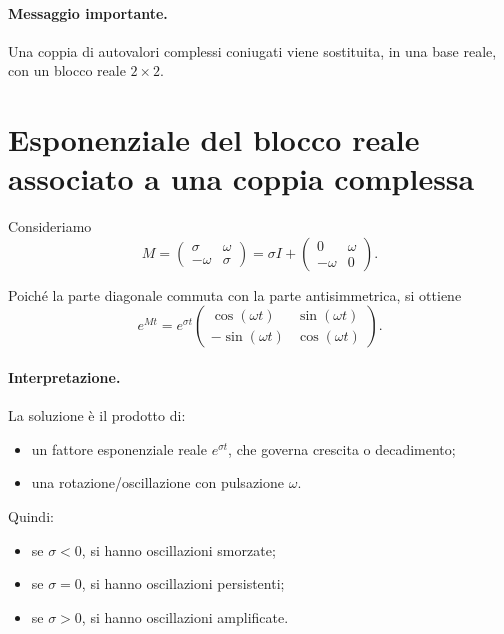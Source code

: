 \paragraph{Messaggio importante.}
Una coppia di autovalori complessi coniugati viene sostituita, in una base reale, con un blocco reale $2\times 2$.

\section{Esponenziale del blocco reale associato a una coppia complessa}

Consideriamo
\[
M=
\begin{pmatrix}
\sigma & \omega\\
-\omega & \sigma
\end{pmatrix}
=
\sigma I+
\begin{pmatrix}
0 & \omega\\
-\omega & 0
\end{pmatrix}.
\]

Poiché la parte diagonale commuta con la parte antisimmetrica, si ottiene
\begin{equation}
e^{Mt}
=
e^{\sigma t}
\begin{pmatrix}
\cos(\omega t) & \sin(\omega t)\\
-\sin(\omega t) & \cos(\omega t)
\end{pmatrix}.
\label{eq:L6_exp_real_complex_block}
\end{equation}

\paragraph{Interpretazione.}
La soluzione è il prodotto di:
\begin{itemize}
    \item un fattore esponenziale reale $e^{\sigma t}$, che governa crescita o decadimento;
    \item una rotazione/oscillazione con pulsazione $\omega$.
\end{itemize}

Quindi:
\begin{itemize}
    \item se $\sigma<0$, si hanno oscillazioni smorzate;
    \item se $\sigma=0$, si hanno oscillazioni persistenti;
    \item se $\sigma>0$, si hanno oscillazioni amplificate.
\end{itemize}

